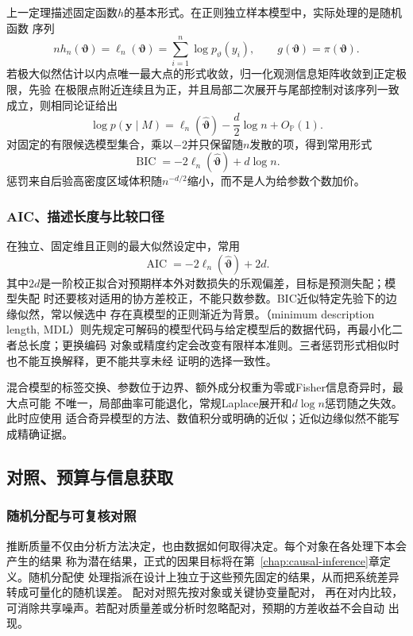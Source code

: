 上一定理描述固定函数\(h\)的基本形式。在正则独立样本模型中，实际处理的是随机函数
序列
\[
  nh_n(\bm\vartheta)=\ell_n(\bm\vartheta)
  =\sum_{i=1}^n\log p_\vartheta(y_i),\qquad
  g(\bm\vartheta)=\pi(\bm\vartheta).
\]
若极大似然估计以内点唯一最大点的形式收敛，归一化观测信息矩阵收敛到正定极限，先验
在极限点附近连续且为正，并且局部二次展开与尾部控制对该序列一致成立，则相同论证给出
\[
  \log p(\bm y\mid M)
  =
  \ell_n(\widehat{\bm\vartheta})
  -\frac d2\log n+O_{\mathbb{P}}(1).
\]
对固定的有限候选模型集合，乘以\(-2\)并只保留随\(n\)发散的项，得到常用形式
\[
  \operatorname{BIC}
  =-2\ell_n(\widehat{\bm\vartheta})+d\log n.
\]
惩罚来自后验高密度区域体积随\(n^{-d/2}\)缩小，而不是人为给参数个数加价。

\subsubsection{AIC、描述长度与比较口径}

在独立、固定维且正则的最大似然设定中，常用
\[
  \operatorname{AIC}
  =-2\ell_n(\widehat{\bm\vartheta})+2d.
\]
其中\(2d\)是一阶校正拟合对预期样本外对数损失的乐观偏差，目标是预测失配；模型失配
时还要核对适用的协方差校正，不能只数参数。BIC近似特定先验下的边缘似然，常以候选中
存在真模型的正则渐近为背景。（minimum description length,
MDL）则先规定可解码的模型代码与给定模型后的数据代码，再最小化二者总长度；更换编码
对象或精度约定会改变有限样本准则。三者惩罚形式相似时也不能互换解释，更不能共享未经
证明的选择一致性。

混合模型的标签交换、参数位于边界、额外成分权重为零或Fisher信息奇异时，最大点可能
不唯一，局部曲率可能退化，常规Laplace展开和\(d\log n\)惩罚随之失效。此时应使用
适合奇异模型的方法、数值积分或明确的近似；近似边缘似然不能写成精确证据。

\subsection{对照、预算与信息获取}
\label{sec:statistics-design-information}

\subsubsection{随机分配与可复核对照}

推断质量不仅由分析方法决定，也由数据如何取得决定。每个对象在各处理下本会产生的结果
称为潜在结果，正式的因果目标将在第~\ref{chap:causal-inference}章定义。随机分配使
处理指派在设计上独立于这些预先固定的结果，从而把系统差异转成可量化的随机误差。
配对对照先按对象或关键协变量配对，
再在对内比较，可消除共享噪声。若配对质量差或分析时忽略配对，预期的方差收益不会自动
出现。

